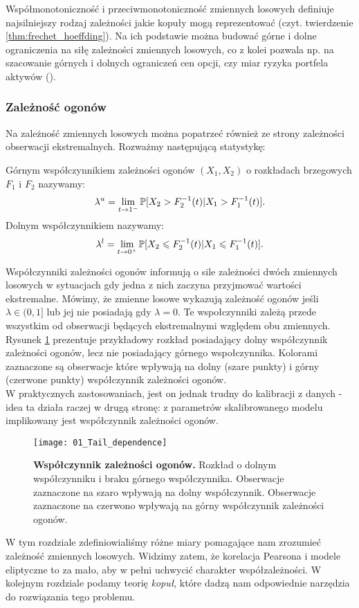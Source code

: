 Współmonotoniczność i przeciwmonotoniczność zmiennych losowych definiuje najsilniejszy rodzaj zależności jakie kopuły mogą reprezentować (czyt. twierdzenie \ref{thm:frechet_hoeffding}). Na ich podstawie można budować górne i dolne ograniczenia na siłę zależności zmiennych losowych, co z kolei pozwala np. na szacowanie górnych i dolnych ograniczeń cen opcji, czy miar ryzyka portfela aktywów (\cite{Cherubini_Copula_Methods_in_Finance}).

\subsubsection{Zależność ogonów}
Na zależność zmiennych losowych można popatrzeć również ze strony zależności obserwacji ekstremalnych. Rozważmy następującą statystykę:

\begin{df}
	Górnym współczynnikiem zależności ogonów $(X_1, X_2)$ o rozkładach brzegowych $F_1$ i $F_2$ nazywamy:
	$$ \lambda^{u} = \lim\limits_{t\to1^{-}}\mathbb{P}[X_2 > F_2^{-1}(t) \vert X_1 > F_1^{-1}(t) ].$$
	Dolnym współczynnikiem nazywamy:
	$$ \lambda^{l} = \lim\limits_{t\to0^{+}}\mathbb{P}[X_2 \leqslant F_2^{-1}(t) \vert X_1 \leqslant F_1^{-1}(t) ].$$
\end{df}

Współczynniki zależności ogonów informują o sile zależności dwóch zmiennych losowych w sytuacjach gdy jedna z nich zaczyna przyjmować wartości ekstremalne. Mówimy, że zmienne losowe wykazują zależność ogonów jeśli $\lambda \in (0, 1]$ lub jej nie posiadają gdy $\lambda =0$. Te wspołczynniki zależą przede wszystkim od obserwacji będących ekstremalnymi względem obu zmiennych. Rysunek \ref{fig:tail_dependence} prezentuje przykładowy rozkład posiadający dolny współczynnik zależności ogonów, lecz nie posiadający górnego wspołczynnika. Kolorami zaznaczone są obserwacje które wpływają na dolny (szare punkty) i górny (czerwone punkty) współczynnik zależności ogonów.\\
W praktycznych zastosowaniach, jest on jednak trudny do kalibracji z danych - idea ta działa raczej w drugą stronę: z parametrów skalibrowanego modelu implikowany jest współczynnik zależności ogonów.
\begin{figure}[H]
	\centering
	\texttt{[image: 01\_Tail\_dependence]}	
	\caption{\textbf{Współczynnik zależności ogonów.} Rozkład o dolnym współczynniku i braku górnego współczynnika. Obserwacje zaznaczone na szaro wpływają na dolny współczynnik. Obserwacje zaznaczone na czerwono wpływają na górny współczynnik zależności ogonów.\label{fig:tail_dependence}}
\end{figure}

W tym rozdziale zdefiniowialiśmy różne miary pomagające nam zrozumieć zależność zmiennych losowych. Widzimy zatem, że korelacja Pearsona i modele eliptyczne to za mało, aby w pełni uchwycić charakter współzależności. W kolejnym rozdziale podamy teorię \emph{kopuł}, które dadzą nam odpowiednie narzędzia do rozwiązania tego problemu.